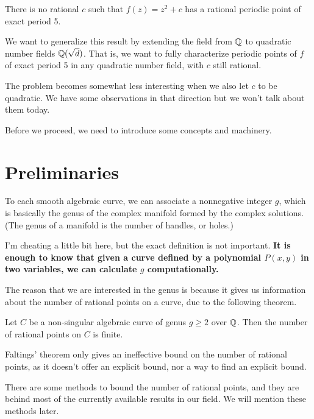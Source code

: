 \begin{theorem}[FPS, 1996]
  There is no rational $c$ such that $f(z) = z^2 + c$ has a rational
  periodic point of exact period 5.
\end{theorem}

We want to generalize this result by extending the field from $\mathbb{Q}$ to
quadratic number fields $\mathbb{Q}(\sqrt{d})$. That is, we want to fully
characterize periodic points of $f$ of exact period 5 in any quadratic
number field, with $c$ still rational.

\begin{remark}
  The problem becomes somewhat less interesting when we also let $c$
  to be quadratic. We have some observations in that direction but we
  won't talk about them today.
\end{remark}

Before we proceed, we need to introduce some concepts and machinery.

\section{Preliminaries}

\begin{definition}
  To each smooth algebraic curve, we can associate a nonnegative
  integer $g$, which is basically the genus of the complex manifold
  formed by the complex solutions. (The genus of a manifold is the
  number of handles, or holes.)
\end{definition}

\begin{remark}
  I'm cheating a little bit here, but the exact definition is not
  important.  \textbf{It is enough to know that given a curve defined
    by a polynomial $P(x, y)$ in two variables, we can calculate $g$
    computationally.}

  The reason that we are interested in the genus is because it gives
  us information about the number of rational points on a curve, due
  to the following theorem.
\end{remark}

\begin{theorem}[Faltings, 1983]
Let $C$ be a non-singular algebraic curve of genus $g \ge 2$ over
$\mathbb{Q}$. Then the number of rational points on $C$ is finite.
\end{theorem}

\begin{remark}
  Faltings' theorem only gives an ineffective bound on the number of
  rational points, as it doesn't offer an explicit bound, nor a way to
  find an explicit bound.

  There are some methods to bound the number of rational points, and
  they are behind most of the currently available results in our
  field. We will mention these methods later.
\end{remark}


